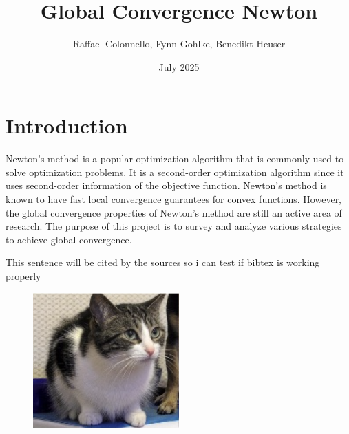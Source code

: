 \documentclass{article}
\title{Global Convergence Newton}
\author{Raffael Colonnello, Fynn Gohlke, Benedikt Heuser}
\date{July 2025}
\begin{document}
\maketitle

\section{Introduction}

Newton's method is a popular optimization algorithm that is commonly used to solve optimization
problems. It is a second-order optimization algorithm since it uses second-order information of the
objective function. Newton's method is known to have fast local convergence guarantees for convex
functions. However, the global convergence properties of Newton's method are still an active area of
research. The purpose of this project is to survey and analyze various strategies to achieve global
convergence.

This sentence will be cited by the sources so i can test if bibtex is working properly \cite{hanzely2022damped} \cite{mishchenko2023regularized}




\begin{figure}
  \begin{center}
    \includegraphics[width=0.5\textwidth]{figures/cat.png}
  \end{center}
  \caption{}\label{fig:}
\end{figure}
\end{document}
